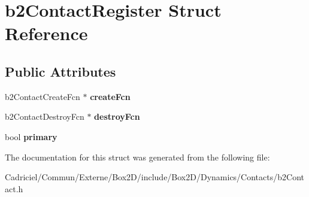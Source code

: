 \hypertarget{structb2_contact_register}{}\section{b2\+Contact\+Register Struct Reference}
\label{structb2_contact_register}
\subsection*{Public Attributes}
\begin{DoxyCompactItemize}
\item 
b2\+Contact\+Create\+Fcn $\ast$ {\bfseries create\+Fcn}\hypertarget{structb2_contact_register_ae065de11ab2f164bd1b8e3a461b41824}{}\label{structb2_contact_register_ae065de11ab2f164bd1b8e3a461b41824}

\item 
b2\+Contact\+Destroy\+Fcn $\ast$ {\bfseries destroy\+Fcn}\hypertarget{structb2_contact_register_a95862aec746f5fd6ffa00a6729dec61f}{}\label{structb2_contact_register_a95862aec746f5fd6ffa00a6729dec61f}

\item 
bool {\bfseries primary}\hypertarget{structb2_contact_register_a43f2d79909505b785b9034b21a56525e}{}\label{structb2_contact_register_a43f2d79909505b785b9034b21a56525e}

\end{DoxyCompactItemize}


The documentation for this struct was generated from the following file\+:\begin{DoxyCompactItemize}
\item 
Cadriciel/\+Commun/\+Externe/\+Box2\+D/include/\+Box2\+D/\+Dynamics/\+Contacts/b2\+Contact.\+h\end{DoxyCompactItemize}
